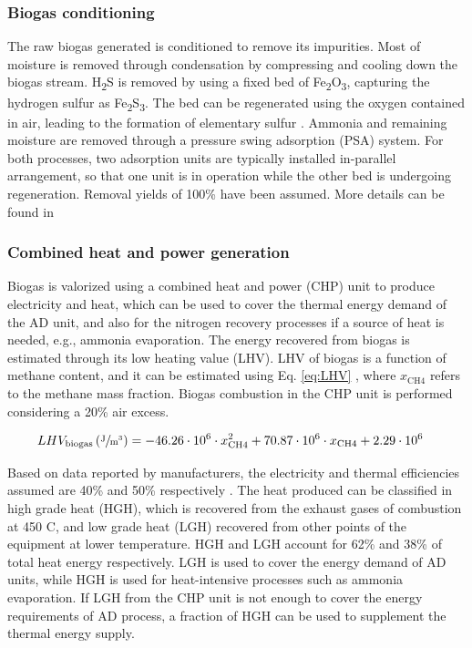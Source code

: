\begin{refsection}[referencesCh6]
\subsubsection{Biogas conditioning}
The raw biogas generated is conditioned to remove
its impurities. Most of moisture is removed through condensation by compressing and cooling down the biogas stream. H\textsubscript{2}S is removed by using a fixed bed of Fe\textsubscript{2}O\textsubscript{3}, capturing the hydrogen sulfur
as Fe\textsubscript{2}S\textsubscript{3}. The bed can be regenerated using the oxygen contained in air, leading to the formation of elementary sulfur \citep{ryckebosch2011techniques}. Ammonia and remaining moisture are removed through a pressure swing adsorption (PSA) system. For both processes, two adsorption units are typically installed in-parallel arrangement, so that one unit is in operation while the other bed is undergoing regeneration. Removal yields of 100\% have been assumed. More details can be found in {}

\subsubsection{Combined heat and power generation}
Biogas is valorized using a combined heat and power (CHP) unit to produce electricity and heat, which can be used to cover the thermal energy demand of the AD unit, and also for the nitrogen recovery processes if a source of heat is needed, e.g., ammonia evaporation. The energy recovered from biogas is estimated through its low heating value (LHV). LHV of biogas is a function of methane content, and it can be estimated using Eq. \ref{eq:LHV} \citep{BiogasLHV}, where $x_{\text{CH4}}$ refers to the methane mass fraction. Biogas combustion in the CHP unit is performed considering a 20\% air excess.

\begin{align}
	& LHV_{\text{biogas}} \left(\sfrac{\text{J}}{\text{m}^3}\right)= -46.26 \cdot 10^6 \cdot x_{\text{CH4}}^2 + 70.87 \cdot 10^6 \cdot x_{\text{CH4}} + 2.29\cdot 10^6 \label{eq:LHV}
\end{align}

Based on data reported by manufacturers, the electricity and thermal efficiencies assumed are 40\% and 50\% respectively \citep{ClarkeEnergy}. The heat produced can be classified in high grade heat (HGH), which is recovered from the exhaust gases of combustion at 450 \textdegree C, and low grade heat (LGH) recovered from other points of the equipment at lower temperature. HGH and LGH account for 62\% and 38\% of total heat energy respectively.
LGH is used to cover the energy demand of AD units, while HGH is used for heat-intensive processes such as ammonia evaporation. If LGH from the CHP unit is not enough to cover the energy requirements of AD process, a fraction of HGH can be used to supplement the thermal energy supply. 


\end{refsection}
